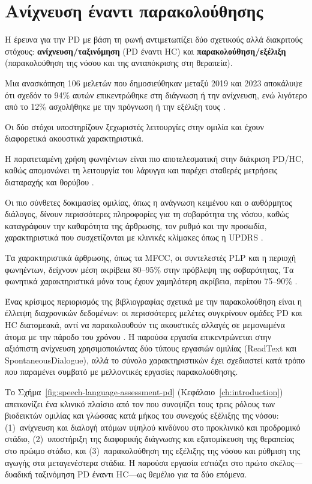 \section{Ανίχνευση έναντι παρακολούθησης}
\label{sec:detection-vs-monitoring}

Η έρευνα για την PD με βάση τη φωνή αντιμετωπίζει δύο σχετικούς αλλά διακριτούς στόχους: \textbf{ανίχνευση/ταξινόμηση} (PD έναντι HC) και \textbf{παρακολούθηση/εξέλιξη} (παρακολούθηση της νόσου και της ανταπόκρισης στη θεραπεία).
 
Μια ανασκόπηση 106 μελετών που δημοσιεύθηκαν μεταξύ 2019 και 2023 αποκάλυψε ότι σχεδόν το 94\% αυτών επικεντρώθηκε στη διάγνωση ή την ανίχνευση, ενώ λιγότερο από το 12\% ασχολήθηκε με την πρόγνωση ή την εξέλιξη τους \citep{xavier2025voice}.

Οι δύο στόχοι υποστηρίζουν ξεχωριστές λειτουργίες στην ομιλία και έχουν διαφορετικά ακουστικά χαρακτηριστικά. 

Η παρατεταμένη χρήση φωνηέντων είναι πιο αποτελεσματική στην διάκριση PD/HC, 
καθώς απομονώνει τη λειτουργία του λάρυγγα και παρέχει σταθερές μετρήσεις διαταραχής και θορύβου \citep{wright2025vocal}. 

Οι πιο σύνθετες δοκιμασίες ομιλίας, όπως η ανάγνωση κειμένου και ο αυθόρμητος διάλογος, 
δίνουν περισσότερες πληροφορίες για τη σοβαρότητα της νόσου, καθώς
καταγράφουν την καθαρότητα της άρθρωσης, τον ρυθμό και την προσωδία, χαρακτηριστικά που συσχετίζονται με κλινικές κλίμακες όπως η UPDRS \citep{wright2025vocal}. 

Τα χαρακτηριστικά άρθρωσης, όπως τα MFCC, οι συντελεστές PLP και η περιοχή φωνηέντων, δείχνουν μέση ακρίβεια 80--95\% στην πρόβλεψη της σοβαρότητας, 
Τα φωνητικά χαρακτηριστικά μόνα τους έχουν χαμηλότερη ακρίβεια, περίπου 75--90\% \citep{wright2025vocal}.

Ένας κρίσιμος περιορισμός της βιβλιογραφίας σχετικά με την παρακολούθηση είναι η έλλειψη διαχρονικών δεδομένων: οι περισσότερες μελέτες συγκρίνουν ομάδες PD και HC διατομεακά, αντί να παρακολουθούν τις ακουστικές αλλαγές σε μεμονωμένα άτομα με την πάροδο του χρόνου \citep{wright2025vocal}. 
Η παρούσα εργασία επικεντρώνεται στην αξιόπιστη ανίχνευση χρησιμοποιώντας δύο τύπους εργασιών ομιλίας (ReadText και SpontaneousDialogue), αλλά το σύνολο χαρακτηριστικών έχει σχεδιαστεί κατά τρόπο που παραμένει συμβατό με μελλοντικές εργασίες παρακολούθησης.

Το Σχήμα~\ref{fig:speech-language-assessment-pd} (Κεφάλαιο~\ref{ch:introduction}) απεικονίζει ένα κλινικό πλαίσιο από τον \citet{cao2025speech} που συνοψίζει τους τρεις ρόλους των βιοδεικτών ομιλίας και γλώσσας κατά μήκος του συνεχούς εξέλιξης της νόσου: (1)~ανίχνευση και διαλογή ατόμων υψηλού κινδύνου στο προκλινικό και προδρομικό στάδιο, (2)~υποστήριξη της διαφορικής διάγνωσης και εξατομίκευση της θεραπείας στο πρώιμο στάδιο, και (3)~παρακολούθηση της εξέλιξης της νόσου και ρύθμιση της αγωγής στα μεταγενέστερα στάδια. Η παρούσα εργασία εστιάζει στο πρώτο σκέλος—δυαδική ταξινόμηση PD έναντι HC—ως θεμέλιο για τα δύο επόμενα.

